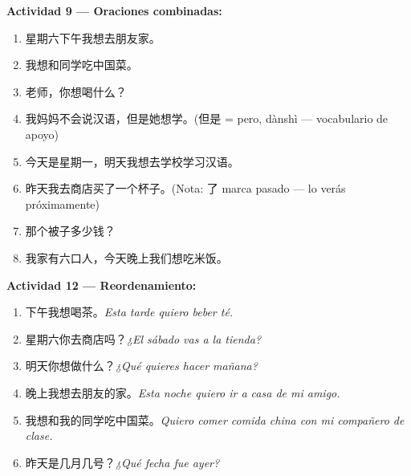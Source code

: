 \documentclass[12pt, a4paper]{article}
\begin{document}
\textbf{Actividad 9 — Oraciones combinadas:}
\begin{enumerate}[leftmargin=1.5cm]
\item 星期六下午我想去朋友家。
\item 我想和同学吃中国菜。
\item 老师，你想喝什么？
\item 我妈妈不会说汉语，但是她想学。\quad (但是 = pero, dànshì — vocabulario de apoyo)
\item 今天是星期一，明天我想去学校学习汉语。
\item 昨天我去商店买了一个杯子。\quad (Nota: 了 marca pasado — lo verás próximamente)
\item 那个被子多少钱？
\item 我家有六口人，今天晚上我们想吃米饭。
\end{enumerate}

\textbf{Actividad 12 — Reordenamiento:}
\begin{enumerate}[leftmargin=1.5cm]
\item 下午我想喝茶。\quad \textit{Esta tarde quiero beber té.}
\item 星期六你去商店吗？\quad \textit{¿El sábado vas a la tienda?}
\item 明天你想做什么？\quad \textit{¿Qué quieres hacer mañana?}
\item 晚上我想去朋友的家。\quad \textit{Esta noche quiero ir a casa de mi amigo.}
\item 我想和我的同学吃中国菜。\quad \textit{Quiero comer comida china con mi compañero de clase.}
\item 昨天是几月几号？\quad \textit{¿Qué fecha fue ayer?}
\end{enumerate}
\end{document}
